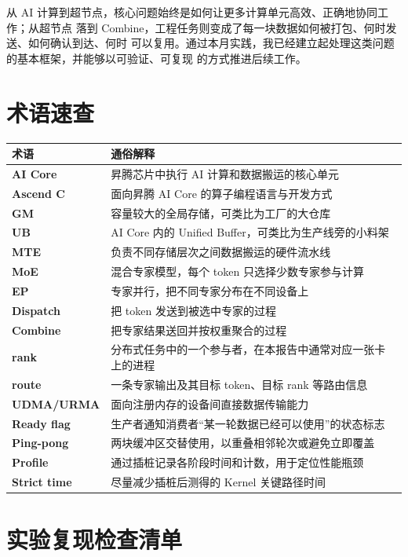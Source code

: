 \documentclass[UTF8,a4paper,11pt]{ctexart}
\begin{document}
从 AI 计算到超节点，核心问题始终是如何让更多计算单元高效、正确地协同工作；从超节点
落到 Combine，工程任务则变成了每一块数据如何被打包、何时发送、如何确认到达、何时
可以复用。通过本月实践，我已经建立起处理这类问题的基本框架，并能够以可验证、可复现
的方式推进后续工作。

\appendix

\section{术语速查}

\begin{longtable}{>{\bfseries}p{}p{}}
  \toprule
  术语 & 通俗解释 \\
  \midrule
  AI Core & 昇腾芯片中执行 AI 计算和数据搬运的核心单元 \\
  Ascend C & 面向昇腾 AI Core 的算子编程语言与开发方式 \\
  GM & 容量较大的全局存储，可类比为工厂的大仓库 \\
  UB & AI Core 内的 Unified Buffer，可类比为生产线旁的小料架 \\
  MTE & 负责不同存储层次之间数据搬运的硬件流水线 \\
  MoE & 混合专家模型，每个 token 只选择少数专家参与计算 \\
  EP & 专家并行，把不同专家分布在不同设备上 \\
  Dispatch & 把 token 发送到被选中专家的过程 \\
  Combine & 把专家结果送回并按权重聚合的过程 \\
  rank & 分布式任务中的一个参与者，在本报告中通常对应一张卡上的进程 \\
  route & 一条专家输出及其目标 token、目标 rank 等路由信息 \\
  UDMA/URMA & 面向注册内存的设备间直接数据传输能力 \\
  Ready flag & 生产者通知消费者“某一轮数据已经可以使用”的状态标志 \\
  Ping-pong & 两块缓冲区交替使用，以重叠相邻轮次或避免立即覆盖 \\
  Profile & 通过插桩记录各阶段时间和计数，用于定位性能瓶颈 \\
  Strict time & 尽量减少插桩后测得的 Kernel 关键路径时间 \\
  \bottomrule
\end{longtable}

\section{实验复现检查清单}
\end{document}

